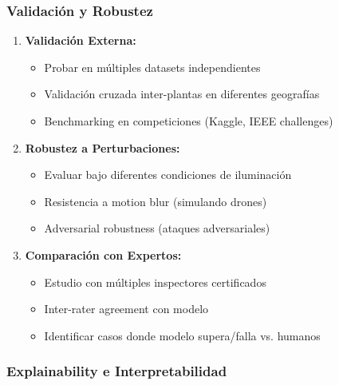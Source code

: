 \documentclass[11pt, a4paper]{article}
\begin{document}
\subsubsection{Validación y Robustez}

\begin{enumerate}
    \item \textbf{Validación Externa:}
    \begin{itemize}
        \item Probar en múltiples datasets independientes
        \item Validación cruzada inter-plantas en diferentes geografías
        \item Benchmarking en competiciones (Kaggle, IEEE challenges)
    \end{itemize}
    
    \item \textbf{Robustez a Perturbaciones:}
    \begin{itemize}
        \item Evaluar bajo diferentes condiciones de iluminación
        \item Resistencia a motion blur (simulando drones)
        \item Adversarial robustness (ataques adversariales)
    \end{itemize}
    
    \item \textbf{Comparación con Expertos:}
    \begin{itemize}
        \item Estudio con múltiples inspectores certificados
        \item Inter-rater agreement con modelo
        \item Identificar casos donde modelo supera/falla vs. humanos
    \end{itemize}
\end{enumerate}

\subsubsection{Explainability e Interpretabilidad}
\end{document}
